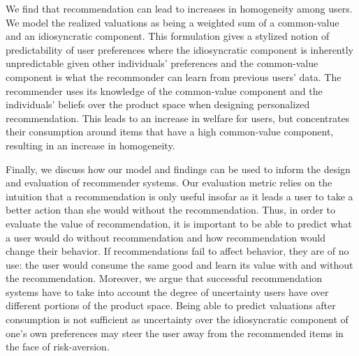 \documentclass[sigconf]{acmart}
\begin{document}
We find that recommendation can lead to increases in homogeneity among users. We model the realized valuations as being a weighted sum of a common-value and an idiosyncratic component. This formulation gives a stylized notion of predictability of user preferences where the idiosyncratic component is inherently unpredictable given other individuals' preferences and the common-value component is what the recommonder can learn from previous users' data. The recommender uses its knowledge of the common-value component and the individuals' beliefs over the product space when designing personalized recommendation. This leads to an increase in welfare for users, but concentrates their consumption around items that have a high common-value component, resulting in an increase in homogeneity.
\par

Finally, we discuss how our model and findings can be used to inform the design and evaluation of recommender systems. Our evaluation metric relies on the intuition that a recommendation is only useful insofar as it leads a user to take a better action than she would without the recommendation. Thus, in order to evaluate the value of recommendation, it is important to be able to predict what a user would do without recommendation and how recommendation would change their behavior. If recommendations fail to affect behavior, they are of no use: the user would consume the same good and learn its value with and without the recommendation. Moreover, we argue that successful recommendation systems have to take into account the degree of uncertainty users have over different portions of the product space. Being able to predict valuations after consumption is not sufficient as uncertainty over the idiosyncratic component of one's own preferences may steer the user away from the recommended items in the face of risk-aversion.
\par
\end{document}
